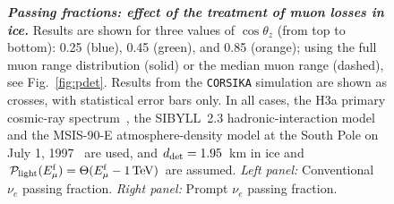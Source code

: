 \documentclass[aps,prd,showpacs,letterpaper,onecolumn,longbibliography,superscriptaddress,notitlepage,nofootinbib]{revtex4-1}%
\newcommand{\Emf}{E_{\mu}^{\rm f}}
\newcommand{\Prob}{{\cal P}}
\newcommand{\CORSIKA}{\texttt{CORSIKA}}
\begin{document}
\begin{figure}
\centering
\caption{\textbf{\textit{Passing fractions: effect of the treatment of muon losses in ice.}} Results are shown for three values of $\cos\theta_z$ (from top to bottom): 0.25 (blue), 0.45 (green), and 0.85 (orange); using the full muon range distribution (solid) or the median muon range (dashed), see Fig.~\ref{fig:pdet}. Results from the \CORSIKA{} simulation are shown as crosses, with statistical error bars only. In all cases, the H3a primary cosmic-ray spectrum~\cite{Gaisser:2011cc}, the SIBYLL~2.3 hadronic-interaction model~\cite{Engel:2015dxa, Riehn:2015oba} and the MSIS-90-E atmosphere-density model at the South Pole on July 1, 1997~\cite{Labitzke:1985, Hedin:1991} are used, and $d_{\rm det} = 1.95$~km in ice and $\Prob_{\rm light}(\Emf) = \Theta(\Emf - 1\,{\rm TeV})$ are assumed. \textit{Left panel:} Conventional $\nu_e$ passing fraction. \textit{Right panel:} Prompt $\nu_e$ passing fraction.
}
\label{fig:nue_passing-preach-effect}
\end{figure}
\end{document}
